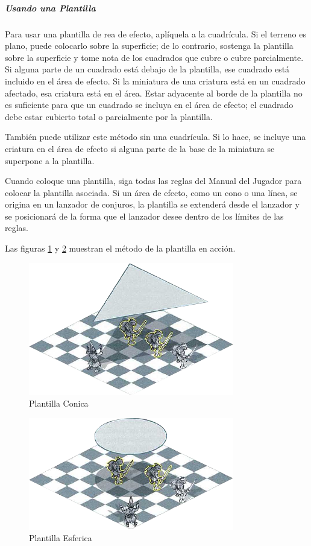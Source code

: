 \documentclass[a4paper,twocolumn,openany,10pt]{dndbook}
\begin{document}
\subparagraph{Usando una Plantilla} Para usar una plantilla de rea de efecto, aplíquela a la cuadrícula. Si el terreno es plano,
puede colocarlo sobre la superficie; de lo contrario, sostenga la plantilla sobre la superficie y tome nota de los cuadrados que
cubre o cubre parcialmente. Si alguna parte de un cuadrado está debajo de la plantilla, ese cuadrado está incluido en el área de
efecto. Si la miniatura de una criatura está en un cuadrado afectado, esa criatura está en el área. Estar adyacente al borde de
la plantilla no es suficiente para que un cuadrado se incluya en el área de efecto; el cuadrado debe estar cubierto total o
parcialmente por la plantilla.

También puede utilizar este método sin una cuadrícula. Si lo hace, se incluye una criatura en el área de efecto si alguna parte
de la base de la miniatura se superpone a la plantilla.

Cuando coloque una plantilla, siga todas las reglas del Manual del Jugador para colocar la plantilla asociada. Si un área de
efecto, como un cono o una línea, se origina en un lanzador de conjuros, la plantilla se extenderá desde el lanzador y se
posicionará de la forma que el lanzador desee dentro de los límites de las reglas.

Las figuras \ref{img:plantillacono} y \ref{img:plantillaesfera} muestran el método de la plantilla en acción. 

\begin{figure}[hbtp]
	\centering
	\includegraphics[scale=1]{img/ConoTemplate.png}
	\caption{Plantilla Conica}
	\label{img:plantillacono}
\end{figure}

\begin{figure}[hbtp]
	\centering
	\includegraphics[scale=1]{img/CirculoTemplate.png}
	\caption{Plantilla Esferica}
	\label{img:plantillaesfera}
\end{figure}
\end{document}
